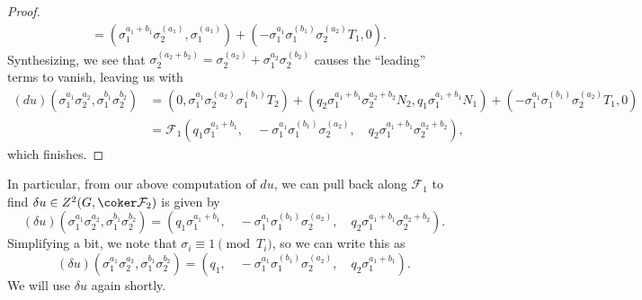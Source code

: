 \documentclass{article}
\begin{document}
\begin{proof}
\begin{align*}
		&= \left(\sigma_1^{a_1+b_1}\sigma_2^{(a_1)},\sigma_1^{(a_1)}\right)+\left(-\sigma_1^{a_1}\sigma_1^{(b_1)}\sigma_2^{(a_2)}T_1,0\right).
	\end{align*}
	Synthesizing, we see that $\sigma_2^{(a_2+b_2)}=\sigma_2^{(a_2)}+\sigma_1^{a_2}\sigma_2^{(b_2)}$ causes the ``leading'' terms to vanish, leaving us with
	\begin{align*}
		(du)\left(\sigma_1^{a_1}\sigma_2^{a_2},\sigma_1^{b_1}\sigma_2^{b_2}\right) &= \left(0,\sigma_1^{a_1}\sigma_2^{(a_2)}\sigma_1^{(b_1)}T_2\right)+\left(q_2\sigma_1^{a_1+b_1}\sigma_2^{a_2+b_2}N_2,q_1\sigma_1^{a_1+b_1}N_1\right)+\left(-\sigma_1^{a_1}\sigma_1^{(b_1)}\sigma_2^{(a_2)}T_1,0\right) \\
		&= \mathcal F_1\left(q_1\sigma_1^{a_1+b_1},\quad-\sigma_1^{a_1}\sigma_1^{(b_1)}\sigma_2^{(a_2)},\quad q_2\sigma_1^{a_1+b_1}\sigma_2^{a_2+b_2}\right),
	\end{align*}
	which finishes.
\end{proof}
In particular, from our above computation of $du$, we can pull back along $\mathcal F_1$ to find $\delta u\in Z^2(G,\coker\mathcal F_2)$ is given by
\[(\delta u)\left(\sigma_1^{a_1}\sigma_2^{a_2},\sigma_1^{b_1}\sigma_2^{b_2}\right)=\left(q_1\sigma_1^{a_1+b_1},\quad-\sigma_1^{a_1}\sigma_1^{(b_1)}\sigma_2^{(a_2)},\quad q_2\sigma_1^{a_1+b_1}\sigma_2^{a_2+b_2}\right).\]
Simplifying a bit, we note that $\sigma_i\equiv1\pmod{T_i}$, so we can write this as
\begin{equation}
	(\delta u)\left(\sigma_1^{a_1}\sigma_2^{a_2},\sigma_1^{b_1}\sigma_2^{b_2}\right)=\left(q_1,\quad-\sigma_1^{a_1}\sigma_1^{(b_1)}\sigma_2^{(a_2)},\quad q_2\sigma_1^{a_1+b_1}\right). \label{eq:deltau}
\end{equation}
We will use $\delta u$ again shortly.
\end{document}
